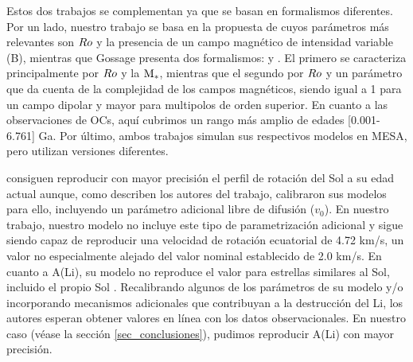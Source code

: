 Estos dos trabajos se complementan ya que se basan en formalismos diferentes. Por un lado, nuestro trabajo se basa en la propuesta de \cite{Gallet2013} cuyos parámetros más relevantes son $Ro$ y la presencia de un campo magnético de intensidad variable (B), mientras que Gossage presenta dos formalismos: \cite{Matt2015} y \cite{Garraffo2018}. El primero se caracteriza principalmente por $Ro$ y la $\mathrm{M}_*$, mientras que el segundo por $Ro$ y un parámetro que da cuenta de la complejidad de los campos magnéticos, siendo igual a 1 para un campo dipolar y mayor para multipolos de orden superior. En cuanto a las observaciones de OCs, aquí cubrimos un rango más amplio de edades [0.001-6.761] Ga. Por último, ambos trabajos simulan sus respectivos modelos en MESA, pero utilizan versiones diferentes.\par

\cite{Gossage2021} consiguen reproducir con mayor precisión el perfil de rotación del Sol a su edad actual \cite[ver][panel (a) de las Figuras 2, 4 \& 6]{Gossage2021} aunque, como describen los autores del trabajo, calibraron sus modelos para ello, incluyendo un parámetro adicional libre de difusión ($v_0$). En nuestro trabajo, nuestro modelo no incluye este tipo de parametrización adicional y sigue siendo capaz de reproducir una velocidad de rotación ecuatorial de 4.72 km/s, un valor no especialmente alejado del valor nominal establecido de 2.0 km/s. En cuanto a A(Li), su modelo no reproduce el valor para estrellas similares al Sol, incluido el propio Sol \cite[ver][panel (d) de las Figuras 2 \& 4, y (b) de la Figura 6]{Gossage2021}. Recalibrando algunos de los parámetros de su modelo y/o incorporando mecanismos adicionales que contribuyan a la destrucción del Li, los autores esperan obtener valores en línea con los datos observacionales. En nuestro caso (véase la sección \ref{sec_conclusiones}), pudimos reproducir A(Li) con mayor precisión.



